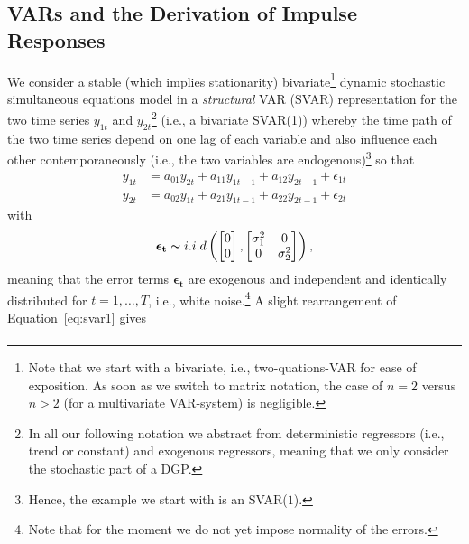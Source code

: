 \documentclass[a4paper,11pt,listof=nochaptergap,oneside,pointednumbers,bibtotoc,bigheadings,liststotoc]{scrbook}
\theoremstyle{mysatz}
\theoremstyle{mydefinition}
\theoremstyle{mybemerkung}
\newcommand{\vect}[1]{\boldsymbol{\mathbf{#1}}}
\begin{document}
\begin{itemize}
\subsection{VARs and the Derivation of Impulse Responses}
We consider a stable (which implies stationarity) bivariate\footnote{Note that we start with a bivariate, i.e., two-quations-VAR for ease of exposition. As soon as we switch to matrix notation, the case of $n=2$ versus $n>2$ (for a multivariate VAR-system) is negligible.} dynamic stochastic simultaneous equations model in a \textit{structural} VAR (SVAR) representation for the two time series $y_{1t}$ and $y_{2t}$\footnote{In all our following notation we abstract from deterministic regressors (i.e., trend or constant) and exogenous regressors, meaning that we only consider the stochastic part of a DGP.} (i.e., a bivariate SVAR(1)) whereby the time path of the two time series depend on one lag of each variable and also influence each other contemporaneously (i.e., the two variables are endogenous)\footnote{Hence, the example we start with is an SVAR($1$).} so that
\begin{equation} \label{eq:svar1}
\begin{split}
	y_{1t} & = a_{01}y_{2t} + a_{11}y_{1t-1} + a_{12}y_{2t-1} + \epsilon_{1t} \\
	y_{2t} & = a_{02}y_{1t} + a_{21}y_{1t-1} + a_{22}y_{2t-1} + \epsilon_{2t}
\end{split}								
\end{equation}
with 
\begin{equation}
\begin{split}
	\vect{\epsilon_t} \thicksim i.i.d \left (  \begin{bmatrix}
    							0 \\
    							0
 							 \end{bmatrix}, \begin{bmatrix}
    							\sigma_{1}^2 & 0  \\
    							0 & \sigma_{2}^2
 							 \end{bmatrix} \right ),
\end{split}								
\end{equation}
meaning that the error terms $\vect{\epsilon_t}$ are exogenous and independent and identically distributed  for $t = 1, \dots, T$, i.e., white noise.\footnote{Note that for the moment we do not yet impose normality of the errors.} A slight rearrangement of Equation~\ref{eq:svar1} gives 
\begin{equation} \label{eq:svar2}
\begin{split}

\end{split}
\end{equation}
\end{itemize}
\end{document}
